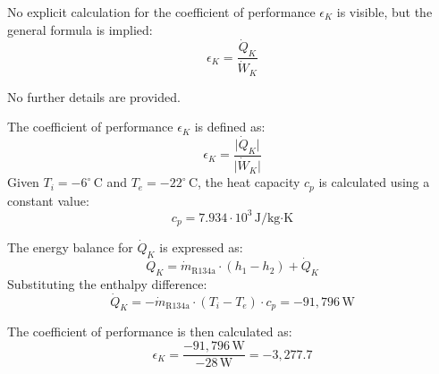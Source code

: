 No explicit calculation for the coefficient of performance \( \epsilon_K \) is visible, but the general formula is implied:  
\[
\epsilon_K = \frac{\dot{Q}_K}{\dot{W}_K}
\]  

No further details are provided.

The coefficient of performance \( \epsilon_K \) is defined as:  
\[
\epsilon_K = \frac{\lvert \dot{Q}_K \rvert}{\lvert \dot{W}_K \rvert}
\]  
Given \( T_i = -6^\circ \, \text{C} \) and \( T_e = -22^\circ \, \text{C} \), the heat capacity \( c_p \) is calculated using a constant value:  
\[
c_p = 7.934 \cdot 10^3 \, \text{J/kg·K}
\]  

The energy balance for \( \dot{Q}_K \) is expressed as:  
\[
\dot{Q}_K = \dot{m}_{\text{R134a}} \cdot (h_1 - h_2) + \dot{Q}_K
\]  
Substituting the enthalpy difference:  
\[
\dot{Q}_K = -\dot{m}_{\text{R134a}} \cdot (T_i - T_e) \cdot c_p = -91,796 \, \text{W}
\]  

The coefficient of performance is then calculated as:  
\[
\epsilon_K = \frac{-91,796 \, \text{W}}{-28 \, \text{W}} = -3,277.7
\]